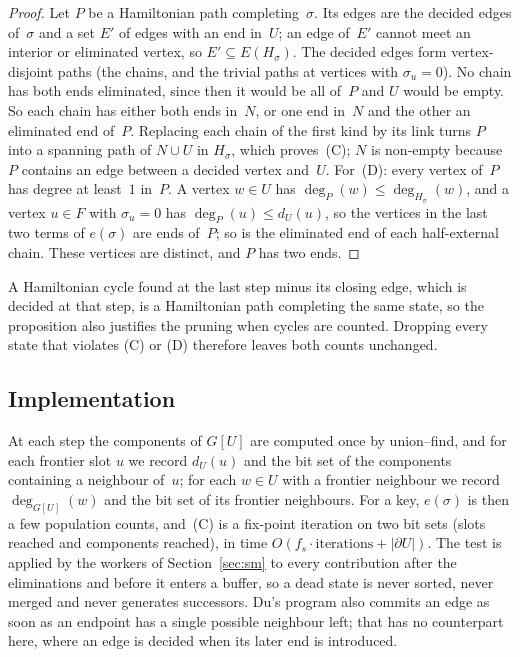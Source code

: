 \documentclass[12pt]{article}
\theoremstyle{definition}
\newcommand{\fs}{f_s}
\begin{document}
\begin{proof}
Let $P$ be a Hamiltonian path completing~$\sigma$.
Its edges are the decided edges of~$\sigma$ and a set $E'$ of edges with an
end in~$U$; an edge of~$E'$ cannot meet an interior or eliminated vertex,
so $E'\subseteq E(H_\sigma)$.
The decided edges form vertex-disjoint paths (the chains, and the trivial
paths at vertices with $\sigma_u=0$).
No chain has both ends eliminated, since then it would be all of~$P$
and $U$ would be empty.
So each chain has either both ends in~$N$, or one end in~$N$ and the other
an eliminated end of~$P$.
Replacing each chain of the first kind by its link turns $P$ into a
spanning path of $N\cup U$ in $H_\sigma$, which proves~(C); $N$ is non-empty
because $P$ contains an edge between a decided vertex and~$U$.
For~(D): every vertex of~$P$ has degree at least~$1$ in~$P$.
A vertex $w\in U$ has $\deg_P(w)\le\deg_{H_\sigma}(w)$, and a vertex
$u\in F$ with $\sigma_u=0$ has $\deg_P(u)\le d_U(u)$, so the vertices in the
last two terms of $e(\sigma)$ are ends of~$P$; so is the eliminated end of
each half-external chain.
These vertices are distinct, and $P$ has two ends.
\end{proof}

A Hamiltonian cycle found at the last step minus its closing edge, which
is decided at that step, is a Hamiltonian path completing the same state,
so the proposition also justifies the pruning when cycles are counted.
Dropping every state that violates (C) or (D) therefore leaves both counts
unchanged.

\subsection{Implementation}

At each step the components of $G[U]$ are computed once by union--find,
and for each frontier slot $u$ we record $d_U(u)$ and the bit set of the
components containing a neighbour of~$u$; for each $w\in U$ with a frontier
neighbour we record $\deg_{G[U]}(w)$ and the bit set of its frontier
neighbours.
For a key, $e(\sigma)$ is then a few population counts, and~(C) is a
fix-point iteration on two bit sets (slots reached and components reached),
in time $O(\fs\cdot\text{iterations}+|\partial U|)$.
The test is applied by the workers of Section~\ref{sec:sm} to every
contribution after the eliminations and before it enters a buffer, so a
dead state is never sorted, never merged and never generates successors.
Du's program also commits an edge as soon as an endpoint has a single
possible neighbour left; that has no counterpart here, where an edge is
decided when its later end is introduced.
\end{document}
